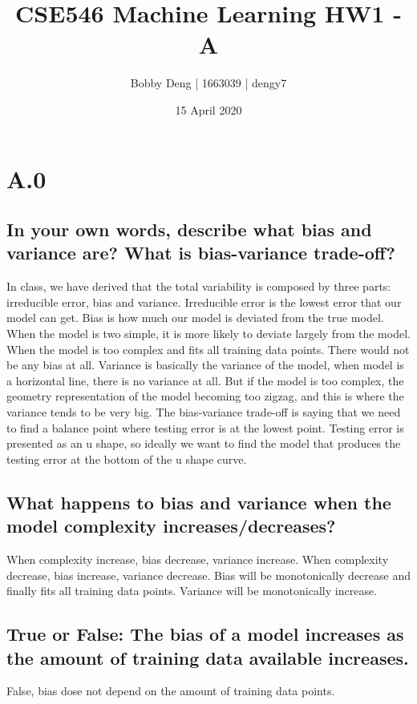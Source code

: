 \documentclass{article}
\title{CSE546 Machine Learning HW1 - A}
\author{Bobby Deng | 1663039 | dengy7 }
\date{15 April 2020}
\begin{document}
\maketitle


\section{A.0}
\subsection{In your own words, describe what bias and variance are? What is bias-variance trade-off?}

In class, we have derived that the total variability is composed by three parts: irreducible error, bias and variance. Irreducible error is the lowest error that our model can get. Bias is how much our model is deviated from the true model. When the model is two simple, it is more likely to deviate largely from the model. When the model is too complex and fits all training data points. There would not be any bias at all. Variance is basically the variance of the model, when model is a horizontal line, there is no variance at all. But if the model is too complex, the geometry representation of the model becoming too zigzag, and this is where the variance tends to be very big.  
The bias-variance trade-off is saying that we need to find a balance point where testing error is at the lowest point. Testing error is presented as an u shape, so ideally we want to find the model that produces the testing error at the bottom of the u shape curve.

\subsection{What happens to bias and variance when the model complexity increases/decreases?}
When complexity increase, bias decrease, variance increase. When complexity decrease, bias increase, variance decrease.
Bias will be monotonically decrease and finally fits all training data points. Variance will be monotonically increase. 

\subsection{True or False: The bias of a model increases as the amount of training data available increases.}

False, bias dose not depend on the amount of training data points.
\end{document}
